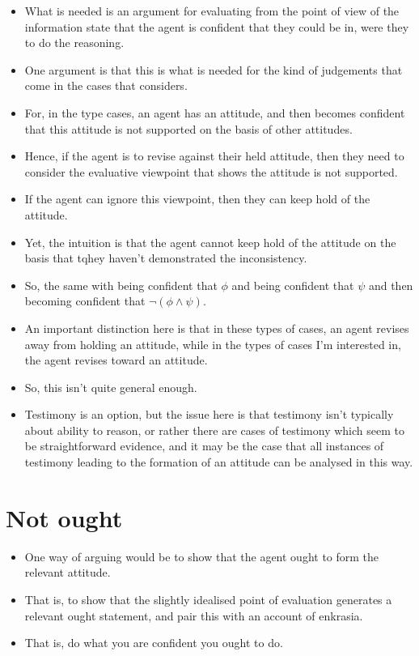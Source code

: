 \documentclass[10pt]{article}
\begin{document}
\begin{itemize}
\item What is needed is an argument for evaluating from the point of view of the information state that the agent is confident that they could be in, were they to do the reasoning.
\item One argument is that this is what is needed for the kind of judgements that come in the cases that \citeauthor{Worsnip:2018aa} considers.
\item For, in the \citeauthor{Worsnip:2018aa} type cases, an agent has an attitude, and then becomes confident that this attitude is not supported on the basis of other attitudes.
\item Hence, if the agent is to revise against their held attitude, then they need to consider the evaluative viewpoint that shows the attitude is not supported.
\item If the agent can ignore this viewpoint, then they can keep hold of the attitude.
\item Yet, the intuition is that the agent cannot keep hold of the attitude on the basis that tqhey haven't demonstrated the inconsistency.
\item So, the same with being confident that \(\phi\) and being confident that \(\psi\) and then becoming confident that \(\lnot(\phi \land \psi)\).
\item An important distinction here is that in these types of cases, an agent revises away from holding an attitude, while in the types of cases I'm interested in, the agent revises toward an attitude.
\item So, this isn't quite general enough.
\item Testimony is an option, but the issue here is that testimony isn't typically about ability to reason, or rather there are cases of testimony which seem to be straightforward evidence, and it may be the case that all instances of testimony leading to the formation of an attitude can be analysed in this way.
\end{itemize}

\section{Not ought}
\label{sec:not-ought}

\begin{itemize}
\item One way of arguing would be to show that the agent ought to form the relevant attitude.
\item That is, to show that the slightly idealised point of evaluation generates a relevant ought statement, and pair this with an account of enkrasia.
\item That is, do what you are confident you ought to do.
\end{itemize}
\end{document}
